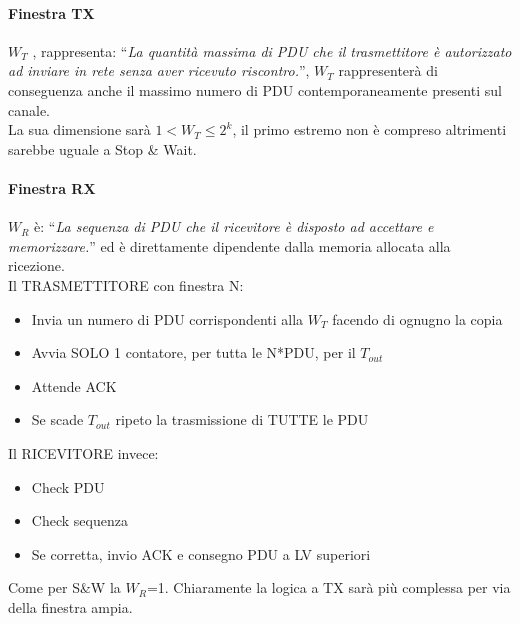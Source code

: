 \documentclass[12pt]{article}
\begin{document}
\paragraph{Finestra TX}
$W_{T}$ , rappresenta: ``\textit{La quantità massima di PDU che il trasmettitore è autorizzato ad inviare in rete senza aver ricevuto riscontro.}'', $W_{T}$ rappresenterà di conseguenza anche il massimo numero di PDU contemporaneamente presenti sul canale.\\
La sua dimensione sarà $1<W_{T}\leq2^k$, il primo estremo non è compreso altrimenti sarebbe uguale a Stop \& Wait.
\paragraph{Finestra RX}
$W_{R}$ è: ``\textit{La sequenza di PDU che il ricevitore è disposto ad accettare e memorizzare.}'' ed è direttamente dipendente dalla memoria allocata alla ricezione.\\
Il TRASMETTITORE con finestra N:
\begin{itemize}
  \item Invia un numero di PDU corrispondenti alla $W_{T}$ facendo di ognugno la copia
  \item Avvia SOLO 1 contatore, per tutta le N*PDU, per il $T_{out}$
  \item Attende ACK
  \item Se scade $T_{out}$ ripeto la trasmissione di TUTTE le PDU
\end{itemize}
Il RICEVITORE invece:
\begin{itemize}
  \item Check PDU
  \item Check sequenza
  \item Se corretta, invio ACK e consegno PDU a LV superiori
\end{itemize}
Come per S\&W la $W_{R}$=1. Chiaramente la logica a TX sarà più complessa per via della finestra ampia.
\end{document}
